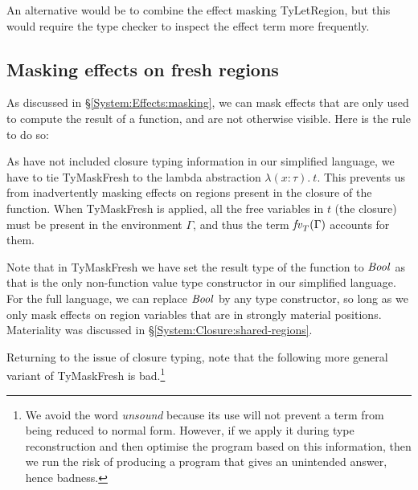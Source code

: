 An alternative would be to combine the effect masking TyLetRegion, but this would require the type checker to inspect the effect term more frequently. 

\clearpage{}
\subsection{Masking effects on fresh regions}
\label{Core:Masking:fresh}

As discussed in \S\ref{System:Effects:masking}, we can mask effects that are only used to compute the result of a function, and are not otherwise visible. Here is the rule to do so:


As have not included closure typing information in our simplified language, we have to tie TyMaskFresh to the lambda abstraction $\lambda (x : \tau). \ t$. This prevents us from inadvertently masking effects on regions present in the closure of the function. When TyMaskFresh is applied, all the free variables in $t$ (the closure) must be present in the environment $\Gamma$, and thus the term $\operatorname{\mathit{fv}}_T(\Gamma)$ accounts for them.

Note that in TyMaskFresh we have set the result type of the function to $\operatorname{\mathit{Bool}}$ as that is the only non-function value type constructor in our simplified language. For the full language, we can replace $\operatorname{\mathit{Bool}}$ by any type constructor, so long as we only mask effects on region variables that are in strongly material positions. Materiality was discussed in \S\ref{System:Closure:shared-regions}.

Returning to the issue of closure typing, note that the following more general variant of TyMaskFresh is bad.\footnote{We avoid the word \emph{unsound} because its use will not prevent a term from being reduced to normal form. However, if we apply it during type reconstruction and then optimise the program based on this information, then we run the risk of producing a program that gives an unintended answer, hence badness. }

